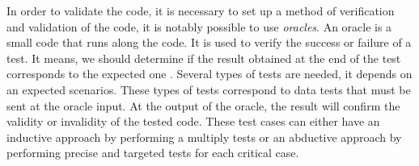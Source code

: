 In order to validate the code, it is necessary to set up a method of verification and validation of the code, it is notably possible to use \textit{oracles}. An oracle is a small code that runs along the code. It is used to verify the success or failure of a test. It means, we should determine if the result obtained at the end of the test corresponds to the expected one \cite{CARVER2018237}.
Several types of tests are needed, it depends on an expected scenarios. These types of tests correspond to data tests that must be sent at the oracle input. At the output of the oracle, the result will confirm the validity or invalidity of the tested code. These test cases can either have an inductive approach by performing a multiply tests or an abductive approach by performing precise and targeted tests for each critical case.





